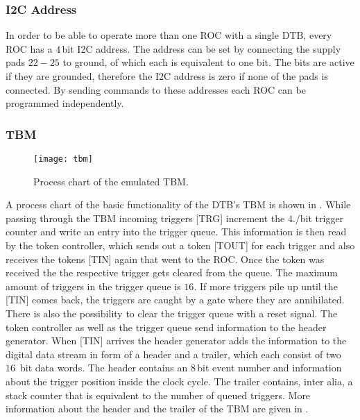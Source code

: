 \subsubsection{\ac{I2C} Address}\label{si2c}
In order to be able to operate more than one \ac{ROC} with a single \ac{DTB}, every \ac{ROC} has a $4\,$bit \ac{I2C} address. The address can be set by connecting the supply pads $22-25$ to ground, of which each is equivalent to one bit. The bits are active if they are grounded, therefore the \ac{I2C} address is zero if none of the pads is connected. By sending commands to these addresses each \ac{ROC} can be programmed independently.
\subsubsection{\ac{TBM}}\label{stbm}
\begin{figure}[ht]
	\centering
	\texttt{[image: tbm]}
	\caption{Process chart of the emulated \ac{TBM}.}
	\label{ptbm}
\end{figure}\no
A process chart of the basic functionality of the \ac{DTB}'s \ac{TBM} is shown in . While passing through the \ac{TBM} incoming triggers [TRG]  increment the $4./$bit trigger counter and write an entry into the trigger queue. This information is then read by the token controller, which sends out a token [TOUT] for each trigger and also receives the tokens [TIN] again that went to the \ac{ROC}. Once the token was received the the respective trigger gets cleared from the queue. The maximum amount of triggers in the trigger queue is $16$. If more triggers pile up until the [TIN] comes back, the triggers are caught by a gate where they are annihilated. There is also the possibility to clear the trigger queue with a reset signal. The token controller as well as the trigger queue send information to the header generator. When [TIN] arrives the header generator adds the information to the digital data stream in form of a header and a trailer, which each consist of two $16\,$ bit data words. The header contains an $8\,$bit event number and information about the trigger position inside the clock cycle.  The trailer contains, inter alia, a stack counter that is equivalent to the number of queued triggers. More information about the header and the trailer of the \ac{TBM} are given in . 
